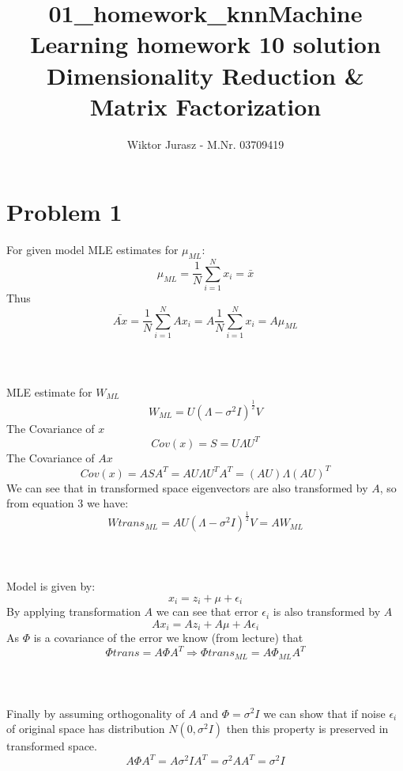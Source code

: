 \documentclass{article}
\title{01\_homework\_knn}
\begin{document}
\title{Machine Learning homework 10 solution \\
        \large Dimensionality Reduction \& Matrix Factorization}
        \author{Wiktor Jurasz - M.Nr. 03709419}
\maketitle
\section{Problem 1}

For given model MLE estimates for $\mu_{ML}$:
\begin{equation}
    \mu_{ML} = \frac{1}{N}\sum_{i=1}^Nx_i = \bar{x}
\end{equation}
Thus 
\begin{equation}
    \bar{Ax} = \frac{1}{N}\sum_{i=1}^NAx_i = A\frac{1}{N}\sum_{i=1}^Nx_i = A\mu_{ML}
\end{equation}
\\\\\\
MLE estimate for $W_{ML}$
\begin{equation}
    W_{ML} = U(\Lambda - \sigma^2I)^{\frac{1}{2}}V
\end{equation}
The Covariance of $x$
\begin{equation}
    Cov(x) = S = U\Lambda U^T
\end{equation}
The Covariance of $Ax$
\begin{equation}
    Cov(x) = ASA^T = AU\Lambda U^TA^T = (AU)\Lambda (AU)^T
\end{equation}
We can see that in transformed space eigenvectors are also transformed 
by $A$, so from equation $3$ we have:
\begin{equation}
    Wtrans_{ML} = AU(\Lambda - \sigma^2I)^{\frac{1}{2}}V = AW_{ML}
\end{equation} 
\\\\\\
Model is given by:
\begin{equation}
    x_i = z_i + \mu + \epsilon_i
\end{equation}
By applying transformation $A$ we can see that error $\epsilon_i$ is also 
transformed by $A$
\begin{equation}
    Ax_i = Az_i + A\mu + A\epsilon_i
\end{equation}
As $\Phi$ is a covariance of the error we know (from lecture) that
\begin{equation}
    \Phi trans = A\Phi A^T \Rightarrow \Phi trans_{ML} = A\Phi_{ML} A^T 
\end{equation} 
\\\\\\
Finally by assuming orthogonality of $A$ and $\Phi = \sigma^2 I$
we can show that if noise $\epsilon_i$ of original space has distribution
$N(0, \sigma^2 I)$ then this property is preserved in transformed space.
\begin{equation}
    A\Phi A^T = A\sigma^2 IA^T = \sigma^2 AA^T = \sigma^2 I
\end{equation}
\end{document}
